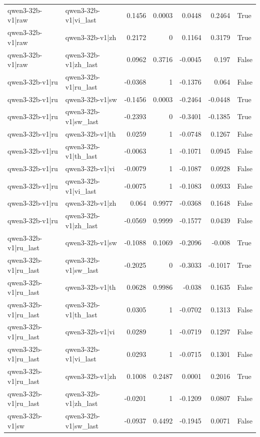 \begin{table}
\begin{tabular}{l l r r r r l}
qwen3-32b-v1|raw & qwen3-32b-v1|vi_last & 0.1456 & 0.0003 & 0.0448 & 0.2464 & True \\
qwen3-32b-v1|raw & qwen3-32b-v1|zh & 0.2172 & 0 & 0.1164 & 0.3179 & True \\
qwen3-32b-v1|raw & qwen3-32b-v1|zh_last & 0.0962 & 0.3716 & -0.0045 & 0.197 & False \\
qwen3-32b-v1|ru & qwen3-32b-v1|ru_last & -0.0368 & 1 & -0.1376 & 0.064 & False \\
qwen3-32b-v1|ru & qwen3-32b-v1|sw & -0.1456 & 0.0003 & -0.2464 & -0.0448 & True \\
qwen3-32b-v1|ru & qwen3-32b-v1|sw_last & -0.2393 & 0 & -0.3401 & -0.1385 & True \\
qwen3-32b-v1|ru & qwen3-32b-v1|th & 0.0259 & 1 & -0.0748 & 0.1267 & False \\
qwen3-32b-v1|ru & qwen3-32b-v1|th_last & -0.0063 & 1 & -0.1071 & 0.0945 & False \\
qwen3-32b-v1|ru & qwen3-32b-v1|vi & -0.0079 & 1 & -0.1087 & 0.0928 & False \\
qwen3-32b-v1|ru & qwen3-32b-v1|vi_last & -0.0075 & 1 & -0.1083 & 0.0933 & False \\
qwen3-32b-v1|ru & qwen3-32b-v1|zh & 0.064 & 0.9977 & -0.0368 & 0.1648 & False \\
qwen3-32b-v1|ru & qwen3-32b-v1|zh_last & -0.0569 & 0.9999 & -0.1577 & 0.0439 & False \\
qwen3-32b-v1|ru_last & qwen3-32b-v1|sw & -0.1088 & 0.1069 & -0.2096 & -0.008 & True \\
qwen3-32b-v1|ru_last & qwen3-32b-v1|sw_last & -0.2025 & 0 & -0.3033 & -0.1017 & True \\
qwen3-32b-v1|ru_last & qwen3-32b-v1|th & 0.0628 & 0.9986 & -0.038 & 0.1635 & False \\
qwen3-32b-v1|ru_last & qwen3-32b-v1|th_last & 0.0305 & 1 & -0.0702 & 0.1313 & False \\
qwen3-32b-v1|ru_last & qwen3-32b-v1|vi & 0.0289 & 1 & -0.0719 & 0.1297 & False \\
qwen3-32b-v1|ru_last & qwen3-32b-v1|vi_last & 0.0293 & 1 & -0.0715 & 0.1301 & False \\
qwen3-32b-v1|ru_last & qwen3-32b-v1|zh & 0.1008 & 0.2487 & 0.0001 & 0.2016 & True \\
qwen3-32b-v1|ru_last & qwen3-32b-v1|zh_last & -0.0201 & 1 & -0.1209 & 0.0807 & False \\
qwen3-32b-v1|sw & qwen3-32b-v1|sw_last & -0.0937 & 0.4492 & -0.1945 & 0.0071 & False \\

\end{tabular}
\end{table}
